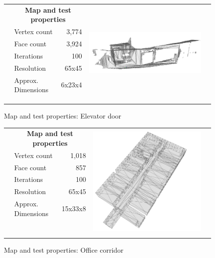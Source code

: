\documentclass[Thesis.tex]{subfiles}
\begin{document}
\begin{figure}\centering
\begin{tabularx}{\textwidth}{XlrrX}
  &\multicolumn{2}{c}{\small\bf Map and test properties} & \multirow{9}{*}{\includegraphics[width=.6\columnwidth]{pics/elvmap}}&\\
	&Vertex count & 3,774 &\\
  &Face count  & 3,924 &\\
  &Iterations  & 100 &\\
  &Resolution  & 65x45 &\\
  &Approx. Dimensions  & 6x23x4 &\\
  &&&\\
  &&&\\
  &&&\\
\end{tabularx}
\caption{Map and test properties: Elevator door}
\label{fig:elvmapprop}
\end{figure}

\begin{figure}\centering
\begin{tabularx}{\textwidth}{XlrrX}
  &\multicolumn{2}{c}{\small\bf Map and test properties} & \multirow{13}{*}{\includegraphics[width=.5\columnwidth]{pics/officemap}}&\\
	&Vertex count & 1,018 &\\
  &Face count  & 857 &\\
  &Iterations  & 100 &\\
  &Resolution  & 65x45 &\\
  &Approx. Dimensions  &15x33x8&\\
  &&&\\
  &&&\\
  &&&\\
  &&&\\
  &&&\\
  &&&\\
  &&&\\
\end{tabularx}
\caption{Map and test properties: Office corridor}
\label{fig:offmapprop}
\end{figure}
\end{document}
